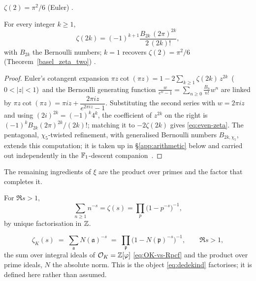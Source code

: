 %

\begin{theorem}\label{basel_zeta_two}
$\zeta(2)=\pi^2/6$ (Euler) .
\end{theorem}

\begin{theorem}\label{thm:even-zeta}
For every integer $k\ge1$,
\begin{equation}\label{eq:even-zeta}
\zeta(2k)=(-1)^{k+1}\frac{B_{2k}\,(2\pi)^{2k}}{2\,(2k)!},
\end{equation}
with $B_{2k}$ the Bernoulli numbers; $k=1$ recovers $\zeta(2)=\pi^2/6$
(Theorem~\ref{basel_zeta_two}) .
\end{theorem}
\begin{proof}
Euler's cotangent expansion
$\pi z\cot(\pi z)=1-2\sum_{k\ge1}\zeta(2k)\,z^{2k}$ \,($0<|z|<1$)\, and the
Bernoulli generating function
$\frac{w}{e^{w}-1}=\sum_{n\ge0}\frac{B_n}{n!}w^{n}$ are linked by
$\pi z\cot(\pi z)=\pi i z+\dfrac{2\pi i z}{e^{2\pi i z}-1}$. Substituting the
second series with $w=2\pi i z$ and using $(2i)^{2k}=(-1)^{k}4^{k}$, the
coefficient of $z^{2k}$ on the right is $(-1)^{k}B_{2k}(2\pi)^{2k}/(2k)!$;
matching it to $-2\zeta(2k)$ gives \eqref{eq:even-zeta}. The pentagonal,
$\chi_5$-twisted refinement, with generalised Bernoulli numbers
$B_{2k,\chi_5}$, extends this computation; it is taken up in
\S\ref{app:arithmetic} below and carried out independently in the $\mathbb{F}_1$-descent
companion~\cite{F1}.
\end{proof}

The remaining ingredients of $\xi$ are the product over primes and the factor that completes it.

\begin{proposition}\label{prop:euler-product}
For $\Re s>1$,
\begin{equation}\label{eq:euler-product}
  \sum_{n\ge1}n^{-s}=\zeta(s)=\prod_{p}\big(1-p^{-s}\big)^{-1},
\end{equation}
by unique factorisation in $\mathbb{Z}$.


\end{proposition}

\begin{definition}\label{def:zetaK}
\begin{equation}\label{eq:zetaK}
  \zeta_K(s)\;=\;\sum_{\mathfrak a}N(\mathfrak a)^{-s}
  \;=\;\prod_{\mathfrak p}\bigl(1-N(\mathfrak p)^{-s}\bigr)^{-1},
  \qquad \Re s>1,
\end{equation}
the sum over integral ideals of $\mathcal{O}_K=\mathbb{Z}[\varphi]$ \eqref{eq:OK-vs-Rpcf} and the product over prime
ideals, $N$ the absolute norm. This is the object \eqref{eq:dedekind} factorises; it is defined
here rather than assumed.


\end{definition}

